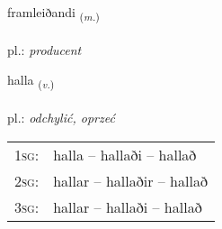 \documentclass[frontgrid, backgrid]{flacards}\usepackage[]{graphicx}\usepackage[]{xcolor}
\begin{document}
\renewcommand{\flhead}{\vskip5pt \fboxsep=0pt {\small\bfseries\footnotesize Nafnorð | Noun}}
\renewcommand{\fcfoot}{\vskip5pt \fboxsep=0pt \hspace{2pt}{\small\bfseries\footnotesize 2K}}

\renewcommand{\blhead}{\vskip5pt {\small\bfseries\footnotesize Nafnorð | Noun }}
\renewcommand{\bcfoot}{\vskip5pt \hspace{2pt}{\small\bfseries\footnotesize 2K}}


{framleiðandi \small{\textsubscript{(\textit{m.})}} \\[1ex] %
\textphonetic{[framleiðantɪ]} \\
pl.: \emph{producent} \\  [2ex]
\renewcommand*{\arraystretch}{0.8}
}

\renewcommand{\flhead}{\vskip5pt \fboxsep=0pt {\small\bfseries\footnotesize Sagnorð | Verb}}
\renewcommand{\fcfoot}{\vskip5pt \fboxsep=0pt \hspace{2pt}{\small\bfseries\footnotesize 2K}}

\renewcommand{\blhead}{\vskip5pt {\small\bfseries\footnotesize Sagnorð | Verb }}
\renewcommand{\bcfoot}{\vskip5pt \hspace{2pt}{\small\bfseries\footnotesize 2K}}


{halla \small{\textsubscript{(\textit{v.})}} \\[1ex] %
\textphonetic{[hatla]} \\
pl.: \emph{odchylić, oprzeć} \\  [2ex]
\renewcommand*{\arraystretch}{0.8}
\begin{tabular}{p{1cm}l}
\textsc{1sg}: & halla -- hallaði -- hallað \\ 
\textsc{2sg}: & hallar -- hallaðir -- hallað \\ 
\textsc{3sg}: & hallar -- hallaði -- hallað \\ 
\end{tabular}
}
\end{document}
